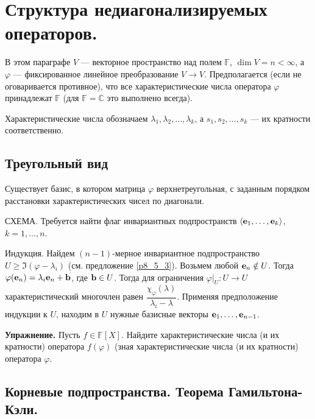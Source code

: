 
\section{Структура недиагонализируемых операторов.}


В этом параграфе $V$ --- векторное пространство над полем $\mathbb{F}$,
$\dim V = n<\infty$, а $\varphi$ --- фиксированное линейное преобразование $V\to V$.
Предполагается (если не оговаривается противное), что все характеристические числа оператора $\varphi$
принадлежат $\mathbb{F}$ (для $\mathbb{F} = \mathbb{C}$ это выполнено всегда).

Характеристические числа обозначаем $\lambda_1, \lambda_2, \ldots , \lambda_k$,
а 
$s_1, s_2, \ldots , s_k$ --- их кратности соответственно.

\subsection{Треугольный вид}


\begin{lemm}\label{trtr}
Существует базис, в котором матрица $\varphi$ верхнетреугольная, с заданным порядком 
расстановки характеристических чисел по диагонали.
\end{lemm}
\dok СХЕМА. Требуется найти флаг инвариантных подпространств $\langle \mathbf{e}_1, \ldots, \mathbf{e}_k \rangle$, $k=1, \ldots, n$.

Индукция. Найдем $(n-1)$-мерное инвариантное подпространство $U\geq \Im(\varphi - \lambda _i)$ 
(см. предложение \ref{p8_5_3}). Возьмем любой $\mathbf{e}_n\notin U$. Тогда $\varphi (\mathbf{e}_n) = \lambda _i \mathbf{e}_n + \mathbf{b}$, где  $\mathbf{b}\in U$. 
Тогда для ограничения $\varphi|_U : U\to U$ характеристический многочлен равен 
$\dfrac{\chi_{\varphi}(\lambda)} {  \lambda _i -\lambda }$.
Применяя предположение индукции к $U$, находим в $U$ нужные базисные векторы
$\mathbf{e}_1, \ldots, \mathbf{e}_{n-1}$.
\edok



\otstup

{\bf Упражнение.}
Пусть $f\in \mathbb{F}[X]$. Найдите характеристические числа (и их кратности)
оператора $f(\varphi)$ (зная характеристические числа (и их кратности)
оператора $\varphi$.


\subsection{Корневые подпространства. Теорема Гамильтона-Кэли.}

